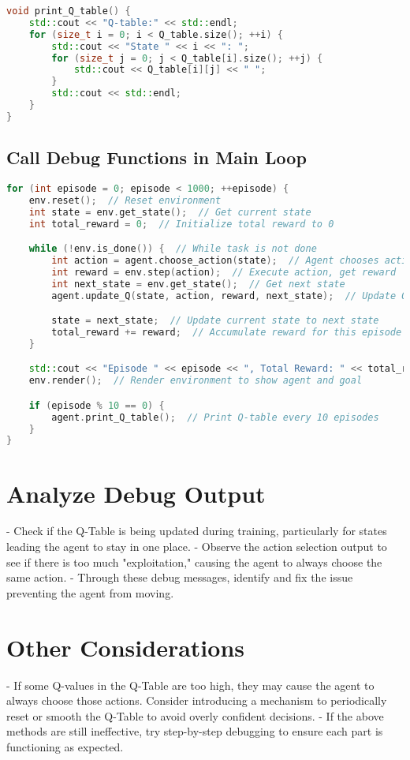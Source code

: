 \documentclass{article}
\begin{document}
\begin{lstlisting}[language=C++]
void print_Q_table() {
    std::cout << "Q-table:" << std::endl;
    for (size_t i = 0; i < Q_table.size(); ++i) {
        std::cout << "State " << i << ": ";
        for (size_t j = 0; j < Q_table[i].size(); ++j) {
            std::cout << Q_table[i][j] << " ";
        }
        std::cout << std::endl;
    }
}
\end{lstlisting}

\subsection*{Call Debug Functions in Main Loop}

\begin{lstlisting}[language=C++]
for (int episode = 0; episode < 1000; ++episode) {
    env.reset();  // Reset environment
    int state = env.get_state();  // Get current state
    int total_reward = 0;  // Initialize total reward to 0

    while (!env.is_done()) {  // While task is not done
        int action = agent.choose_action(state);  // Agent chooses action
        int reward = env.step(action);  // Execute action, get reward
        int next_state = env.get_state();  // Get next state
        agent.update_Q(state, action, reward, next_state);  // Update Q-table

        state = next_state;  // Update current state to next state
        total_reward += reward;  // Accumulate reward for this episode
    }

    std::cout << "Episode " << episode << ", Total Reward: " << total_reward << std::endl;
    env.render();  // Render environment to show agent and goal

    if (episode % 10 == 0) {
        agent.print_Q_table();  // Print Q-table every 10 episodes
    }
}
\end{lstlisting}

\section*{Analyze Debug Output}

- Check if the Q-Table is being updated during training, particularly for states leading the agent to stay in one place.
- Observe the action selection output to see if there is too much "exploitation," causing the agent to always choose the same action.
- Through these debug messages, identify and fix the issue preventing the agent from moving.

\section*{Other Considerations}

- If some Q-values in the Q-Table are too high, they may cause the agent to always choose those actions. Consider introducing a mechanism to periodically reset or smooth the Q-Table to avoid overly confident decisions.
- If the above methods are still ineffective, try step-by-step debugging to ensure each part is functioning as expected.
\end{document}
